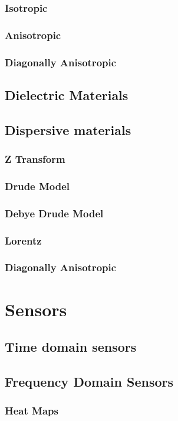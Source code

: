 \documentclass[./JimHeneghanDissertation.tex]{subfiles}
\begin{document}
				\subsubsection{Isotropic}
				\subsubsection{Anisotropic}
				\subsubsection{Diagonally Anisotropic}
			\subsection{Dielectric Materials}
			\subsection{Dispersive materials}
				\subsubsection{Z Transform}
				\subsubsection{Drude Model}
				\subsubsection{Debye Drude Model}
				\subsubsection{Lorentz}
				\subsubsection{Diagonally Anisotropic}

		\section{Sensors}
			\subsection{Time domain sensors}
			\subsection{Frequency Domain Sensors}
				\subsubsection{Heat Maps}
\end{document}

